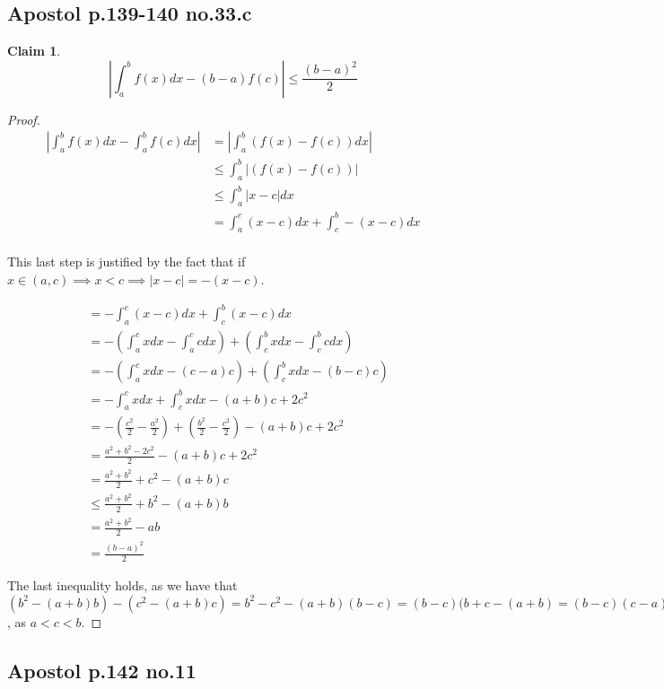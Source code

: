 \documentclass[12pt,letterpaper]{article}
\theoremstyle{definition}
\newtheorem*{claim}{Claim}
\begin{document}
\subsection*{Apostol p.139-140 no.33.c}

\begin{claim}
  \[
    \left| \int_a^bf(x)dx - (b-a)f(c) \right| \leq \frac{(b-a)^2}{2}
  \]
\end{claim}

\begin{proof}
  \begin{align*}
    \left|\int_a^bf(x)dx - \int_a^bf(c)dx\right| &= \left|\int_a^b(f(x) - f(c))dx\right| \\
    &\leq \int_a^b|(f(x) - f(c))| \\
    &\leq \int_a^b|x - c|dx \\
    &= \int_a^c(x-c)dx + \int_c^b-(x-c)dx \\
  \end{align*}

  This last step is justified by the fact that if $x \in (a,c) \implies x < c
  \implies |x-c| = -(x-c)$.
  
  \begin{align*}
    &= -\int_a^c(x-c)dx + \int_c^b(x-c)dx \\
    &= -(\int_a^cxdx - \int_a^ccdx) + (\int_c^b xdx - \int_c^b cdx) \\
    &= -(\int_a^c xdx - (c-a)c) + (\int_c^b xdx - (b-c)c) \\
    &= -\int_a^cxdx + \int_c^bxdx - (a+b)c + 2c^2 \\
    &= -(\frac{c^2}{2} - \frac{a^2}{2}) + (\frac{b^2}{2} - \frac{c^2}{2}) - (a+b)c + 2c^2 \\
    &= \frac{a^2 + b^2 - 2c^2}{2} - (a+b)c + 2c^2 \\
    &= \frac{a^2 + b^2}{2} + c^2 - (a+b)c \\
    &\leq \frac{a^2 + b^2}{2} + b^2 - (a+b)b \\
    &= \frac{a^2 + b^2}{2} - ab \\
    &= \frac{(b-a)^2}{2}
  \end{align*}

  The last inequality holds, as we have that $(b^2 - (a+b)b) - (c^2 - (a+b)c) =
  b^2 - c^2 - (a+b)(b-c) = (b-c)(b+c - (a+b) = (b-c)(c-a) > 0$, as $a < c < b$.
\end{proof}


\subsection*{Apostol p.142 no.11}
\end{document}
